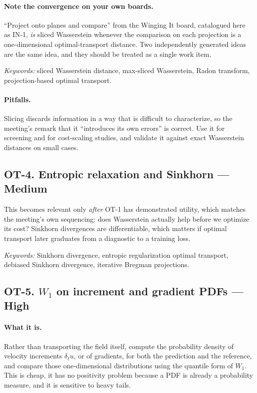 \documentclass[11pt]{article}
\newcommand{\High}{\textbf{High}}
\newcommand{\Med}{Medium}
\newcommand{\keywords}[1]{\par\smallskip\noindent\textit{Keywords:} #1}
\begin{document}
\paragraph{Note the convergence on your own boards.} ``Project onto planes and compare''
from the Winging It board, catalogued here as IN-1, \emph{is} sliced Wasserstein whenever
the comparison on each projection is a one-dimensional optimal-transport distance. Two
independently generated ideas are the same idea, and they should be treated as a single
work item.

\keywords{sliced Wasserstein distance, max-sliced Wasserstein, Radon transform,
projection-based optimal transport.}

\paragraph{Pitfalls.} Slicing discards information in a way that is difficult to
characterize, so the meeting's remark that it ``introduces its own errors'' is correct. Use
it for screening and for cost-scaling studies, and validate it against exact Wasserstein
distances on small cases.

\subsection{OT-4. Entropic relaxation and Sinkhorn --- \Med{}}

This becomes relevant only \emph{after} OT-1 has demonstrated utility, which matches the
meeting's own sequencing: does Wasserstein actually help before we optimize its cost?
Sinkhorn divergences are differentiable, which matters if optimal transport later graduates
from a diagnostic to a training loss.

\keywords{Sinkhorn divergence, entropic regularization optimal transport, debiased Sinkhorn
divergence, iterative Bregman projections.}

\subsection{OT-5. $W_1$ on increment and gradient PDFs --- \High{}}

\paragraph{What it is.} Rather than transporting the field itself, compute the probability
density of velocity increments $\delta_\ell u$, or of gradients, for both the prediction and
the reference, and compare those one-dimensional distributions using the quantile form of
$W_1$. This is cheap, it has no positivity problem because a PDF is already a probability
measure, and it is sensitive to heavy tails.
\end{document}
